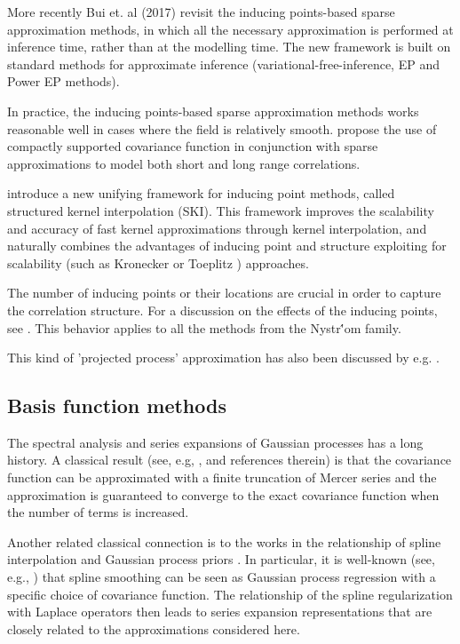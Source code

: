 \documentclass[]{interact}
\theoremstyle{plain}%
\theoremstyle{definition}
\theoremstyle{remark}
\begin{document}
More recently Bui et. al (2017) revisit the inducing points-based sparse approximation methods, in which all the necessary approximation is performed at inference time, rather than at the modelling time. The new framework is built on standard methods for approximate inference (variational-free-inference, EP and Power EP methods). 

In practice, the inducing points-based sparse approximation methods works reasonable well in cases where the field is relatively smooth. \cite{vanhatalo2010approximate}
propose the use of compactly supported covariance function in conjunction with sparse approximations to model both short and long range correlations.

\cite{wilson2015kernel} introduce a new unifying framework for inducing point methods, called structured kernel interpolation (SKI). This framework improves the scalability and accuracy of fast kernel approximations through kernel interpolation, and naturally combines the advantages of inducing point and structure exploiting for scalability (such as Kronecker \citep{saatcci2012scalable} or Toeplitz \citep{cunningham2008fast}) approaches.

The number of inducing points or their locations are crucial in order to capture the correlation structure. For a discussion on the effects of the inducing points, see \cite{vanhatalo2010approximate}. This behavior applies to all the methods from the Nystr\''om family.

This kind of 'projected process' approximation has also been discussed by e.g. \cite{banerjee2008gaussian}.


\subsection{Basis function methods}

The spectral analysis and series expansions of Gaussian processes has a long history. A classical result (see, e.g, \cite{loeve1977probability,trees1968detection,adler1981geometry,cramer2013stationary}, and references therein) is that the covariance function can be approximated with a finite truncation of Mercer series and the approximation is guaranteed to converge to the exact covariance function when the number of terms is increased. 

Another related classical connection is to the works in the relationship of spline interpolation and Gaussian process priors \citep{wahba1978improper,kimeldorf1970correspondence,wahba1990spline}. In particular, it is well-known (see, e.g., \cite{wahba1990spline}) that spline smoothing can be seen as Gaussian process regression with a specific choice of covariance function. The relationship of the spline regularization with Laplace operators then leads to series expansion representations that are closely related to the approximations considered here. 
\end{document}
